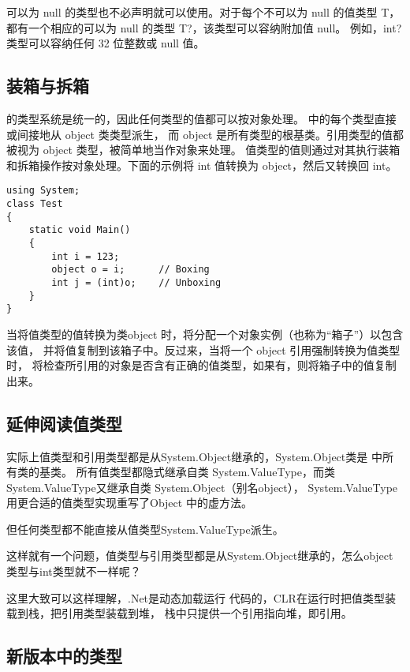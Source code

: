 可以为 null 的类型也不必声明就可以使用。对于每个不可以为 null 的值类型 T，
都有一个相应的可以为 null 的类型 T?，该类型可以容纳附加值 null。
例如，int? 类型可以容纳任何 32 位整数或 null 值。

\subsection{装箱与拆箱}
 \cs  的类型系统是统一的，因此任何类型的值都可以按对象处理。 \cs  中的每个类型直接或间接地从 object 类类型派生，
而 object 是所有类型的根基类。引用类型的值都被视为 object 类型，被简单地当作对象来处理。
值类型的值则通过对其执行装箱和拆箱操作按对象处理。下面的示例将 int 值转换为 object，然后又转换回 int。

\begin{lstlisting}
using System;
class Test
{
    static void Main()
    {
        int i = 123;
        object o = i;      // Boxing
        int j = (int)o;    // Unboxing
    }
}
\end{lstlisting}

当将值类型的值转换为类object 时，将分配一个对象实例（也称为“箱子”）以包含该值，
并将值复制到该箱子中。反过来，当将一个 object 引用强制转换为值类型时，
将检查所引用的对象是否含有正确的值类型，如果有，则将箱子中的值复制出来。


\subsection{延伸阅读值类型}

实际上值类型和引用类型都是从System.Object继承的，System.Object类是 \cs 中所有类的基类。
所有值类型都隐式继承自类 System.ValueType，而类System.ValueType又继承自类 System.Object（别名object），
System.ValueType 用更合适的值类型实现重写了Object 中的虚方法。 

但任何类型都不能直接从值类型System.ValueType派生。

这样就有一个问题，值类型与引用类型都是从System.Object继承的，怎么object类型与int类型就不一样呢？

这里大致可以这样理解，.Net是动态加载运行 \cs 代码的，CLR在运行时把值类型装载到栈，把引用类型装载到堆，
栈中只提供一个引用指向堆，即引用。

\subsection{\cs 新版本中的类型}

